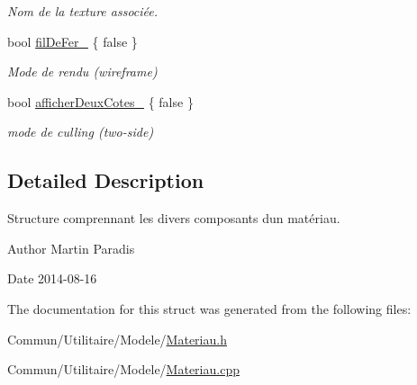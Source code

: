\begin{DoxyCompactItemize}
\begin{DoxyCompactList}\small\item\em Nom de la texture associée. \end{DoxyCompactList}\item 
\hypertarget{structmodele_1_1_materiau_a55e6d3d19eb038d86097568353cbad06}{}bool \hyperlink{structmodele_1_1_materiau_a55e6d3d19eb038d86097568353cbad06}{fil\+De\+Fer\+\_\+} \{ false \}\label{structmodele_1_1_materiau_a55e6d3d19eb038d86097568353cbad06}

\begin{DoxyCompactList}\small\item\em Mode de rendu (wireframe) \end{DoxyCompactList}\item 
\hypertarget{structmodele_1_1_materiau_aab5dc5905e9d580acdeba0bcc7853108}{}bool \hyperlink{structmodele_1_1_materiau_aab5dc5905e9d580acdeba0bcc7853108}{afficher\+Deux\+Cotes\+\_\+} \{ false \}\label{structmodele_1_1_materiau_aab5dc5905e9d580acdeba0bcc7853108}

\begin{DoxyCompactList}\small\item\em mode de culling (two-\/side) \end{DoxyCompactList}\end{DoxyCompactItemize}


\subsection{Detailed Description}
Structure comprennant les divers composants d\textquotesingle{}un matériau. 

\begin{DoxyAuthor}{Author}
Martin Paradis 
\end{DoxyAuthor}
\begin{DoxyDate}{Date}
2014-\/08-\/16 
\end{DoxyDate}


The documentation for this struct was generated from the following files\+:\begin{DoxyCompactItemize}
\item 
Commun/\+Utilitaire/\+Modele/\hyperlink{_materiau_8h}{Materiau.\+h}\item 
Commun/\+Utilitaire/\+Modele/\hyperlink{_materiau_8cpp}{Materiau.\+cpp}\end{DoxyCompactItemize}
